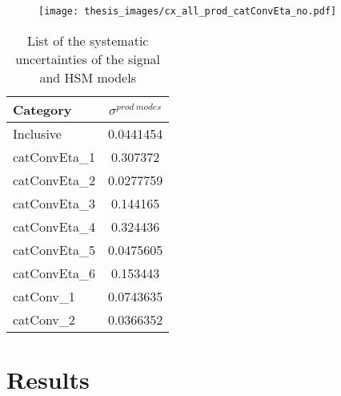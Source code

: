 \documentclass[a4paper, oneside, 11pt, openright]{book}
\begin{document}
\begin{itemize}
	 				\begin{figure}
	 					\centering
	 					\texttt{[image: thesis\_images/cx\_all\_prod\_catConvEta\_no.pdf]}
	 					\caption{}
	 					\label{fig:prod_mode_syst}
	 				\end{figure}
 					\begin{center}
 						\begin{table}[tbp]
 							\centering
 							\begin{tabular}{lc}
 								\toprule[1.5pt]
 								Category		& $\sigma^{prod\ modes}$	\\
 								\midrule
 								Inclusive		& 0.0441454				\\
 								\midrule
 								catConvEta\_1 	& 0.307372				\\
 								catConvEta\_2 	& 0.0277759				\\
 								catConvEta\_3 	& 0.144165				\\
 								catConvEta\_4 	& 0.324436				\\
 								catConvEta\_5 	& 0.0475605				\\
 								catConvEta\_6 	& 0.153443				\\
 								\midrule
 								catConv\_1 		& 0.0743635				\\
 								catConv\_2 		& 0.0366352				\\
 								\bottomrule[1.5pt]
 							\end{tabular}
 							\caption{List of the systematic uncertainties of the signal and HSM models}
 							\label{tab:prod_mode}
 						\end{table}
 					\end{center}
 				\end{itemize} 
 			
 				
 				
 		\section{Results}
 				
 				
	\newpage
	
	
	
\end{document}
